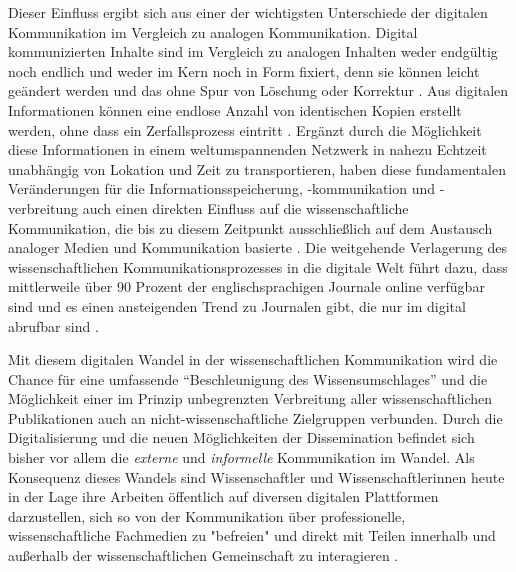 Dieser Einfluss ergibt sich aus einer der wichtigsten Unterschiede der digitalen Kommunikation im Vergleich zu analogen Kommunikation. Digital kommunizierten Inhalte sind im Vergleich zu analogen Inhalten weder endgültig noch endlich und weder im Kern noch in Form fixiert, denn sie können leicht geändert werden und das ohne Spur von Löschung oder Korrektur \cite{smith_1999_digitize}. Aus digitalen Informationen können eine endlose Anzahl von identischen Kopien erstellt werden, ohne dass ein Zerfallsprozess eintritt \cite{smith_1999_digitize}. Ergänzt durch die Möglichkeit diese Informationen in einem weltumspannenden Netzwerk in nahezu Echtzeit unabhängig von Lokation und Zeit zu transportieren, haben diese fundamentalen Veränderungen für die Informationsspeicherung, -kommunikation und -verbreitung auch einen direkten Einfluss auf die wissenschaftliche Kommunikation, die bis zu diesem Zeitpunkt ausschließlich auf dem Austausch analoger Medien und Kommunikation basierte \cite{seidenfaden_2005_kommunikation}. Die weitgehende Verlagerung des wissenschaftlichen Kommunikationsprozesses in die digitale Welt führt dazu, dass mittlerweile über 90 Prozent der englischsprachigen Journale online verfügbar sind und es einen ansteigenden Trend zu Journalen gibt, die nur im digital abrufbar sind \cite{cope2014future} \cite{cite:5}.

Mit diesem digitalen Wandel in der wissenschaftlichen Kommunikation wird die Chance für eine umfassende “Beschleunigung des Wissensumschlages” \cite{Wenzel_2003} und die Möglichkeit einer im Prinzip unbegrenzten Verbreitung aller wissenschaftlichen Publikationen \cite{bbaw_publizieren_2015} \cite{yiotis_2013_open} auch an nicht-wissenschaftliche Zielgruppen \cite{Konneker_2013} verbunden. Durch die Digitalisierung und die neuen Möglichkeiten der Dissemination befindet sich bisher vor allem die \textit{externe} und \textit{informelle} Kommunikation im Wandel. Als Konsequenz dieses Wandels sind Wissenschaftler und Wissenschaftlerinnen heute in der Lage ihre Arbeiten öffentlich auf diversen digitalen Plattformen darzustellen, sich so von der Kommunikation über professionelle, wissenschaftliche Fachmedien zu "befreien" und direkt mit Teilen innerhalb und außerhalb der wissenschaftlichen Gemeinschaft zu interagieren \cite{Konneker_2013}.

